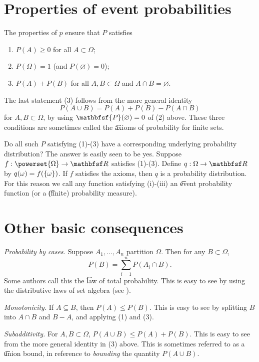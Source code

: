 \section*{Properties of event probabilities}

The properties of $p$ ensure that $P$ satisfies
    \begin{enumerate}
      \item $P(A) \geq 0$ for all $A \subset \Omega $;
      \item $P(\Omega ) = 1$ (and $P(\varnothing) = 0$);
      \item $P(A) + P(B)$ for all $A, B \subset \Omega $ and $A \cap  B = \varnothing$.
    \end{enumerate}
The last statement (3) follows from the more general identity
\[
P(A \cup B) = P(A) + P(B) - P(A \cap  B)
\]
for $A, B \subset \Omega $, by using $\mathbfsf{P} (\varnothing) = 0$ of (2) above.
These three conditions are sometimes called the \t{axioms of probability for finite sets}.

Do all such $P$ satisfying (1)-(3) have a corresponding underlying probability distribution?
The answer is easily seen to be yes.
Suppose $f: \powerset{\Omega } \to \R $ satisfies (1)-(3).
Define $q: \Omega  \to \R $ by $q(\omega ) = f(\{\omega \})$.
If $f$ satisfies the axioms, then $q$ is a probability distribution.
For this reason we call any function satisfying (i)-(iii) an \t{event probability function} (or a \t{(finite) probability measure}).

\section*{Other basic consequences}

\textit{Probability by cases.}
Suppose $A_1, \dots , A_n$ partition $\Omega $.
Then for any $B \subset \Omega $,
\[
\textstyle
P(B) = \sum_{i = 1}^{n} P(A_i \cap  B).
\]
Some authors call this the \t{law of total probability}.
This is easy to see by using the distributive laws of set algebra (see ).

\textit{Monotonicity.}
If $A \subseteq B$, then $P(A) \leq P(B)$.
This is easy to see by splitting $B$ into $A \cap  B$ and $B - A$, and applying (1) and (3).

\textit{Subadditivity.}
For $A, B \subset \Omega $, $P(A \cup B) \leq P(A) + P(B)$.
This is easy to see from the more general identity in (3) above.
This is sometimes referred to as a \t{union bound}, in reference to \textit{bounding} the quantity $P(A \cup B)$.
